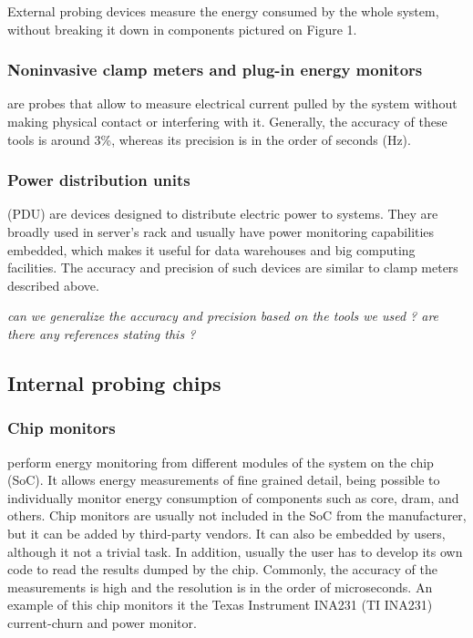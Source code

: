 \documentclass[a4paper]{jpconf}
\begin{document}
External probing devices measure the energy consumed by the whole system, 
without breaking it down in components pictured on Figure 1. 

\subsubsection{Noninvasive clamp meters and plug-in energy monitors} are probes 
that allow to measure electrical current pulled by the system without making 
physical contact or interfering with it. Generally, the accuracy of these tools
 is around 3\%, whereas its precision is in the order of seconds (Hz).

\subsubsection{Power distribution units} (PDU) are devices designed to distribute
electric power to systems. They are broadly used in server's rack and usually
have power monitoring capabilities embedded, which makes it useful for data
warehouses and big computing facilities. The accuracy and precision of such 
devices are similar to clamp meters described above.

\textit {can we generalize the accuracy and precision based on the tools
we used ? are there any references stating this ?}

\subsection{Internal probing chips}

\subsubsection{Chip monitors} perform energy monitoring from different modules
of the system on the chip (SoC). It allows energy measurements of fine grained
detail, being possible to individually monitor energy consumption of components 
such as core, dram, and others. Chip monitors are usually not included in the 
SoC from the manufacturer, but it can be added by third-party vendors. It can 
also be embedded by users, although it not a trivial task. In addition, usually
 the user has to develop its own code to read the results dumped by the chip. 
Commonly, the accuracy
of the measurements is high and the resolution is in the order of microseconds. 
An example of this chip monitors it the Texas Instrument INA231 (TI INA231)
\cite{TIINA231} current-churn and power monitor. 
\end{document}

